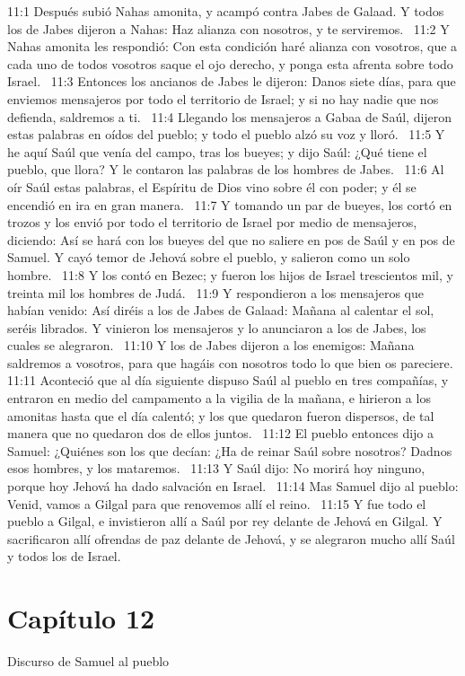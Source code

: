 11:1 Después subió Nahas amonita, y acampó contra Jabes de Galaad. Y todos los de Jabes dijeron a Nahas: Haz alianza con nosotros, y te serviremos.  
11:2 Y Nahas amonita les respondió: Con esta condición haré alianza con vosotros, que a cada uno de todos vosotros saque el ojo derecho, y ponga esta afrenta sobre todo Israel.  
11:3 Entonces los ancianos de Jabes le dijeron: Danos siete días, para que enviemos mensajeros por todo el territorio de Israel; y si no hay nadie que nos defienda, saldremos a ti.  
11:4 Llegando los mensajeros a Gabaa de Saúl, dijeron estas palabras en oídos del pueblo; y todo el pueblo alzó su voz y lloró.  
11:5 Y he aquí Saúl que venía del campo, tras los bueyes; y dijo Saúl: ¿Qué tiene el pueblo, que llora? Y le contaron las palabras de los hombres de Jabes.  
11:6 Al oír Saúl estas palabras, el Espíritu de Dios vino sobre él con poder; y él se encendió en ira en gran manera.  
11:7 Y tomando un par de bueyes, los cortó en trozos y los envió por todo el territorio de Israel por medio de mensajeros, diciendo: Así se hará con los bueyes del que no saliere en pos de Saúl y en pos de Samuel. Y cayó temor de Jehová sobre el pueblo, y salieron como un solo hombre.  
11:8 Y los contó en Bezec; y fueron los hijos de Israel trescientos mil, y treinta mil los hombres de Judá.  
11:9 Y respondieron a los mensajeros que habían venido: Así diréis a los de Jabes de Galaad: Mañana al calentar el sol, seréis librados. Y vinieron los mensajeros y lo anunciaron a los de Jabes, los cuales se alegraron.  
11:10 Y los de Jabes dijeron a los enemigos: Mañana saldremos a vosotros, para que hagáis con nosotros todo lo que bien os pareciere.  
11:11 Aconteció que al día siguiente dispuso Saúl al pueblo en tres compañías, y entraron en medio del campamento a la vigilia de la mañana, e hirieron a los amonitas hasta que el día calentó; y los que quedaron fueron dispersos, de tal manera que no quedaron dos de ellos juntos.  
11:12 El pueblo entonces dijo a Samuel: ¿Quiénes son los que decían: ¿Ha de reinar Saúl sobre nosotros? Dadnos esos hombres, y los mataremos.  
11:13 Y Saúl dijo: No morirá hoy ninguno, porque hoy Jehová ha dado salvación en Israel.  
11:14 Mas Samuel dijo al pueblo: Venid, vamos a Gilgal para que renovemos allí el reino.  
11:15 Y fue todo el pueblo a Gilgal, e invistieron allí a Saúl por rey delante de Jehová en Gilgal. Y sacrificaron allí ofrendas de paz delante de Jehová, y se alegraron mucho allí Saúl y todos los de Israel.  
\section*{Capítulo 12 }
Discurso de Samuel al pueblo  

